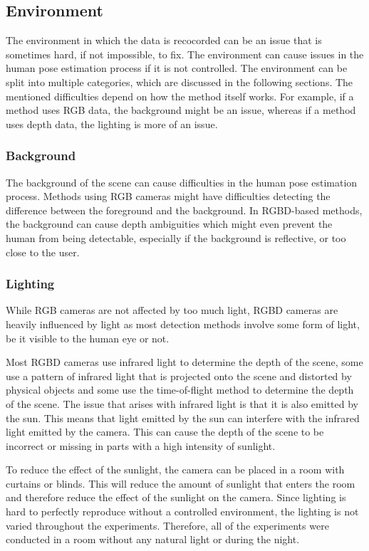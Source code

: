 \subsection{Environment}

The environment in which the data is recocorded can be an issue that is sometimes hard, if not impossible, to fix. The environment can cause issues in the human pose estimation process if it is not controlled. The environment can be split into multiple categories, which are discussed in the following sections. The mentioned difficulties depend on how the method itself works. For example, if a method uses RGB data, the background might be an issue, whereas if a method uses depth data, the lighting is more of an issue.

\subsubsection{Background}

The background of the scene can cause difficulties in the human pose estimation process. Methods using RGB cameras might have difficulties detecting the difference between the foreground and the background. In RGBD-based methods, the background can cause depth ambiguities which might even prevent the human from being detectable, especially if the background is reflective, or too close to the user.

\subsubsection{Lighting}

While RGB cameras are not affected by too much light, RGBD cameras are heavily influenced by light as most detection methods involve some form of light, be it visible to the human eye or not.

Most RGBD cameras use infrared light to determine the depth of the scene, some use a pattern of infrared light that is projected onto the scene and distorted by physical objects and some use the time-of-flight method to determine the depth of the scene. The issue that arises with infrared light is that it is also emitted by the sun. This means that light emitted by the sun can interfere with the infrared light emitted by the camera. This can cause the depth of the scene to be incorrect or missing in parts with a high intensity of sunlight.

To reduce the effect of the sunlight, the camera can be placed in a room with curtains or blinds. This will reduce the amount of sunlight that enters the room and therefore reduce the effect of the sunlight on the camera. Since lighting is hard to perfectly reproduce without a controlled environment, the lighting is not varied throughout the experiments. Therefore, all of the experiments were conducted in a room without any natural light or during the night.

